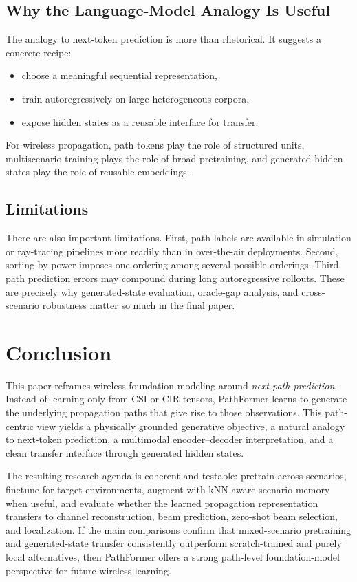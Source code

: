 \documentclass[11pt]{article}
\begin{document}
\subsection{Why the Language-Model Analogy Is Useful}
The analogy to next-token prediction is more than rhetorical. It suggests a concrete recipe:
\begin{itemize}[leftmargin=1.5em]
    \item choose a meaningful sequential representation,
    \item train autoregressively on large heterogeneous corpora,
    \item expose hidden states as a reusable interface for transfer.
\end{itemize}
For wireless propagation, path tokens play the role of structured units, multiscenario training plays the role of broad pretraining, and generated hidden states play the role of reusable embeddings.

\subsection{Limitations}
There are also important limitations. First, path labels are available in simulation or ray-tracing pipelines more readily than in over-the-air deployments. Second, sorting by power imposes one ordering among several possible orderings. Third, path prediction errors may compound during long autoregressive rollouts. These are precisely why generated-state evaluation, oracle-gap analysis, and cross-scenario robustness matter so much in the final paper.

\section{Conclusion}
This paper reframes wireless foundation modeling around \emph{next-path prediction}. Instead of learning only from CSI or CIR tensors, PathFormer learns to generate the underlying propagation paths that give rise to those observations. This path-centric view yields a physically grounded generative objective, a natural analogy to next-token prediction, a multimodal encoder--decoder interpretation, and a clean transfer interface through generated hidden states.

The resulting research agenda is coherent and testable: pretrain across scenarios, finetune for target environments, augment with kNN-aware scenario memory when useful, and evaluate whether the learned propagation representation transfers to channel reconstruction, beam prediction, zero-shot beam selection, and localization. If the main comparisons confirm that mixed-scenario pretraining and generated-state transfer consistently outperform scratch-trained and purely local alternatives, then PathFormer offers a strong path-level foundation-model perspective for future wireless learning.
\end{document}
